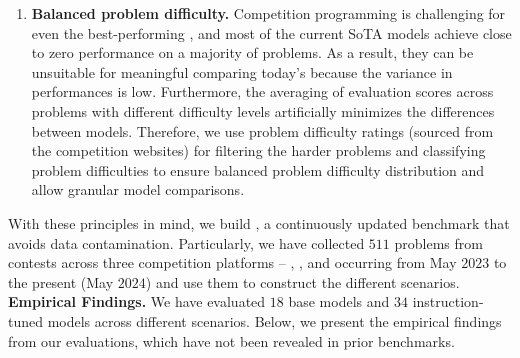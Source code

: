 \begin{enumerate}
    \item \textbf{Balanced problem difficulty.} 
    Competition programming is challenging for even the best-performing \llms{}, and most of the current SoTA models achieve close to zero performance on a majority of problems.
    As a result, they can be unsuitable for meaningful comparing today's \llms{} because the variance in performances is low.
    Furthermore, the averaging of evaluation scores across problems with different difficulty levels artificially minimizes the differences between models.
    Therefore, we use problem difficulty ratings (sourced from the competition websites) for filtering the harder problems and 
    classifying problem difficulties to
    ensure balanced problem difficulty distribution and allow granular model comparisons.
\end{enumerate} 



\noindent With these principles in mind, we build \livecodebench{}, a continuously updated benchmark that avoids data contamination.
Particularly, we have collected $511$ problems from contests across three competition platforms -- \leetcode{}, \atcoder{}, and \codeforces{} occurring from May $2023$ to the present (May $2024$) and use them to construct the different \livecodebench{} scenarios. 
\newline
\newline
\noindent \textbf{Empirical Findings.} 
We have evaluated $18$ base models and $34$ instruction-tuned models across different \livecodebench{} scenarios.
Below, we present the empirical findings from our evaluations, which have not been revealed in prior benchmarks.

